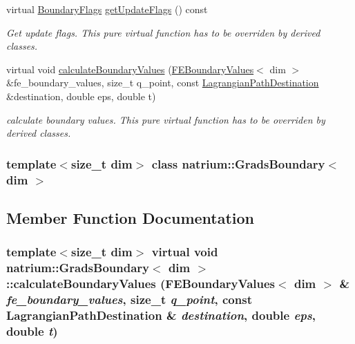 \begin{DoxyCompactItemize}
\item 
virtual \hyperlink{namespacenatrium_a93b2a3d564675413b9f6cc88c60f46af}{BoundaryFlags} \hyperlink{classnatrium_1_1GradsBoundary_a1f8deb8033e218d7890b0db5d72f5508}{getUpdateFlags} () const 
\begin{DoxyCompactList}\small\item\em Get update flags. This pure virtual function has to be overriden by derived classes. \item\end{DoxyCompactList}\item 
virtual void \hyperlink{classnatrium_1_1GradsBoundary_a66b6623d5701b3a8e40d3527412e37df}{calculateBoundaryValues} (\hyperlink{classnatrium_1_1FEBoundaryValues}{FEBoundaryValues}$<$ dim $>$ \&fe\_\-boundary\_\-values, size\_\-t q\_\-point, const \hyperlink{structnatrium_1_1LagrangianPathDestination}{LagrangianPathDestination} \&destination, double eps, double t)
\begin{DoxyCompactList}\small\item\em calculate boundary values. This pure virtual function has to be overriden by derived classes. \item\end{DoxyCompactList}\end{DoxyCompactItemize}
\subsubsection*{template$<$size\_\-t dim$>$ class natrium::GradsBoundary$<$ dim $>$}



\subsection{Member Function Documentation}
\hypertarget{classnatrium_1_1GradsBoundary_a66b6623d5701b3a8e40d3527412e37df}{
\subsubsection[{calculateBoundaryValues}]{\setlength{\rightskip}{0pt plus 5cm}template$<$size\_\-t dim$>$ virtual void {\bf natrium::GradsBoundary}$<$ dim $>$::calculateBoundaryValues ({\bf FEBoundaryValues}$<$ dim $>$ \& {\em fe\_\-boundary\_\-values}, \/  size\_\-t {\em q\_\-point}, \/  const {\bf LagrangianPathDestination} \& {\em destination}, \/  double {\em eps}, \/  double {\em t})}}
\label{classnatrium_1_1GradsBoundary_a66b6623d5701b3a8e40d3527412e37df}


